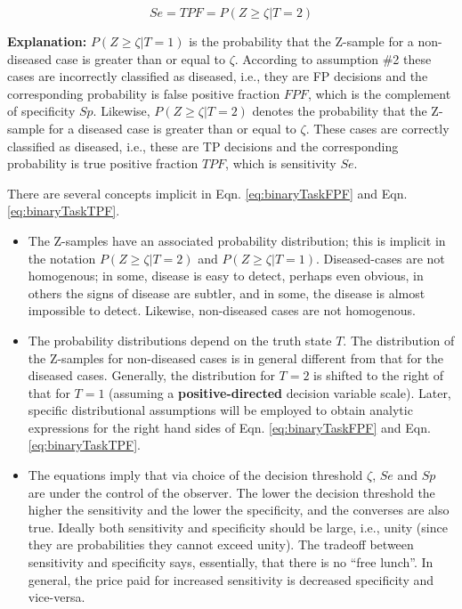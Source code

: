 \documentclass[
]{book}
\providecommand{\tightlist}{%
  \setlength{\itemsep}{0pt}\setlength{\parskip}{0pt}}
\begin{document}
\begin{equation} 
Se=TPF=P(Z\ge \zeta|T=2)
\label{eq:binaryTaskTPF}
\end{equation}

\textbf{Explanation:} \(P(Z\ge \zeta|T=1)\) is the probability that the Z-sample for a non-diseased case is greater than or equal to \(\zeta\). According to assumption \#2 these cases are incorrectly classified as diseased, i.e., they are FP decisions and the corresponding probability is false positive fraction \(FPF\), which is the complement of specificity \(Sp\). Likewise, \(P(Z\ge \zeta|T=2)\) denotes the probability that the Z-sample for a diseased case is greater than or equal to \(\zeta\). These cases are correctly classified as diseased, i.e., these are TP decisions and the corresponding probability is true positive fraction \(TPF\), which is sensitivity \(Se\).

There are several concepts implicit in Eqn. \eqref{eq:binaryTaskFPF} and Eqn. \eqref{eq:binaryTaskTPF}.

\begin{itemize}
\tightlist
\item
  The Z-samples have an associated probability distribution; this is implicit in the notation \(P(Z\ge \zeta|T=2)\) and \(P(Z\ge \zeta|T=1)\). Diseased-cases are not homogenous; in some, disease is easy to detect, perhaps even obvious, in others the signs of disease are subtler, and in some, the disease is almost impossible to detect. Likewise, non-diseased cases are not homogenous.
\item
  The probability distributions depend on the truth state \(T\). The distribution of the Z-samples for non-diseased cases is in general different from that for the diseased cases. Generally, the distribution for \(T = 2\) is shifted to the right of that for \(T = 1\) (assuming a \textbf{positive-directed} decision variable scale). Later, specific distributional assumptions will be employed to obtain analytic expressions for the right hand sides of Eqn. \eqref{eq:binaryTaskFPF} and Eqn. \eqref{eq:binaryTaskTPF}.
\item
  The equations imply that via choice of the decision threshold \(\zeta\), \(Se\) and \(Sp\) are under the control of the observer. The lower the decision threshold the higher the sensitivity and the lower the specificity, and the converses are also true. Ideally both sensitivity and specificity should be large, i.e., unity (since they are probabilities they cannot exceed unity). The tradeoff between sensitivity and specificity says, essentially, that there is no ``free lunch''. In general, the price paid for increased sensitivity is decreased specificity and vice-versa.
\end{itemize}
\end{document}
